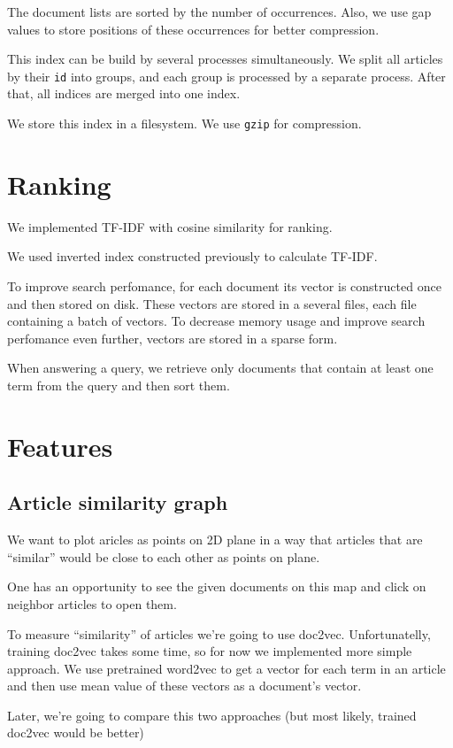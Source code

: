 The document lists are sorted by the number of occurrences. Also, we use gap values to store positions of these occurrences for better compression.

This index can be build by several processes simultaneously. We split all articles by their \texttt{id} into groups, and each group is processed by a separate process. After that, all indices are merged into one index.

We store this index in a filesystem. We use \texttt{gzip} for compression.

\section{Ranking}
We implemented TF-IDF with cosine similarity for ranking.

We used inverted index constructed previously to calculate TF-IDF. 

To improve search perfomance, for each document its vector is constructed once and then stored on disk. 
These vectors are stored in a several files, each file containing a batch of vectors.
To decrease memory usage and improve search perfomance even further, vectors are stored in a sparse form.

When answering a query, we retrieve only documents that contain at least one term from the query and then sort them.


\section{Features}
\subsection{Article similarity graph}
We want to plot aricles as points on 2D plane in a way that articles that are ``similar'' would be close to each other as points on plane.

One has an opportunity to see the given documents on this map and click on neighbor articles to open them. 

To measure ``similarity'' of articles we're going to use doc2vec. 
Unfortunatelly, training doc2vec takes some time, so for now we implemented more simple approach.
We use pretrained word2vec to get a vector for each term in an article and then use mean value of these vectors as a document's vector.

Later, we're going to compare this two approaches (but most likely, trained doc2vec would be better)

